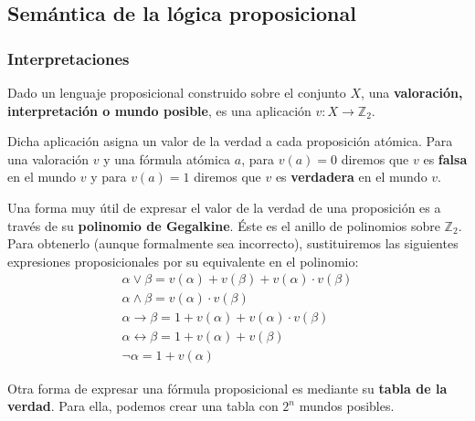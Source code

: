 \subsection{Semántica de la lógica proposicional}
\subsubsection{Interpretaciones}
\begin{ndef}[Interpretación]
    Dado un lenguaje proposicional construido sobre el conjunto $X$, una \textbf{valoración, interpretación o mundo posible}, es una aplicación $v: X \rightarrow \mathbb{Z}_2$.
\end{ndef}
Dicha aplicación asigna un valor de la verdad a cada proposición atómica.
Para una valoración $v$ y una fórmula atómica $a$, para $v(a)=0$ diremos que $v$ es \textbf{falsa} en el mundo $v$ y para $v(a)=1$ diremos que $v$ es \textbf{verdadera} en el mundo $v$.

Una forma muy útil de expresar el valor de la verdad de una proposición es a través de su \textbf{polinomio de Gegalkine}. Éste es el anillo de polinomios sobre $\mathbb{Z}_2$. Para obtenerlo (aunque formalmente sea incorrecto), sustituiremos las siguientes expresiones proposicionales por su equivalente en el polinomio:
\begin{align*}
    \alpha \lor \beta = v(\alpha) + v(\beta) + v(\alpha) \cdot v(\beta) \\
    \alpha \land \beta = v(\alpha) \cdot v(\beta)                       \\
    \alpha \rightarrow \beta = 1 + v(\alpha) + v(\alpha) \cdot v(\beta) \\
    \alpha \leftrightarrow \beta = 1 + v(\alpha) + v(\beta)             \\
    \neg \alpha = 1 + v(\alpha)
\end{align*}

Otra forma de expresar una fórmula proposicional es mediante su \textbf{tabla de la verdad}. Para ella, podemos crear una tabla con $2^n$ mundos posibles.

